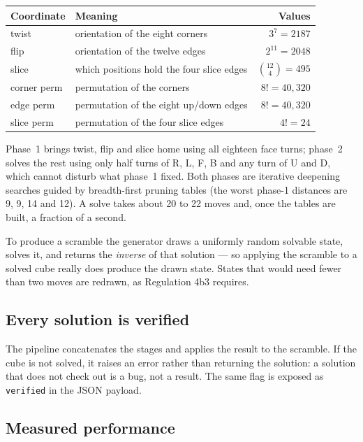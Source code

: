 \begin{center}
\begin{tabular}{@{}llr@{}}
\toprule
Coordinate & Meaning & Values \\
\midrule
twist        & orientation of the eight corners & $3^7 = 2187$ \\
flip         & orientation of the twelve edges & $2^{11} = 2048$ \\
slice        & which positions hold the four slice edges & $\binom{12}{4} = 495$ \\
corner perm  & permutation of the corners & $8! = 40{,}320$ \\
edge perm    & permutation of the eight up/down edges & $8! = 40{,}320$ \\
slice perm   & permutation of the four slice edges & $4! = 24$ \\
\bottomrule
\end{tabular}
\end{center}

Phase~1 brings twist, flip and slice home using all eighteen face turns; phase~2
solves the rest using only half turns of R, L, F, B and any turn of U and D, which
cannot disturb what phase~1 fixed.  Both phases are iterative deepening searches
guided by breadth-first pruning tables (the worst phase-1 distances are 9, 9, 14
and 12).  A solve takes about 20 to 22 moves and, once the tables are built, a
fraction of a second.

To produce a scramble the generator draws a uniformly random solvable state, solves
it, and returns the \emph{inverse} of that solution --- so applying the scramble to a
solved cube really does produce the drawn state.  States that would need fewer than
two moves are redrawn, as Regulation 4b3 requires.

\subsection{Every solution is verified}

The pipeline concatenates the stages and applies the result to the scramble.  If the
cube is not solved, it raises an error rather than returning the solution: a
solution that does not check out is a bug, not a result.  The same flag is exposed as
\texttt{verified} in the JSON payload.

\subsection{Measured performance}


